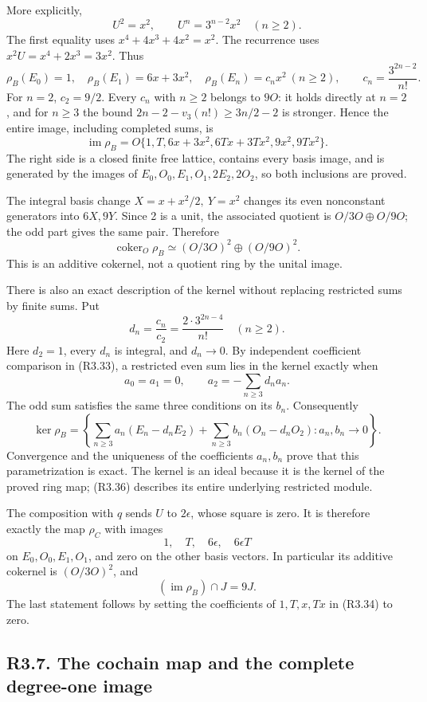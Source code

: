 \documentclass[
  10pt,
]{article}
\begin{document}
More explicitly, \[
U^2=x^2,\qquad U^n=3^{n-2}x^2\quad(n\ge2).
\tag{R3.32}
\] The first equality uses \(x^4+4x^3+4x^2=x^2\). The recurrence uses
\(x^2U=x^4+2x^3=3x^2\). Thus \[
\rho_B(E_0)=1,\quad \rho_B(E_1)=6x+3x^2,\quad
\rho_B(E_n)=c_nx^2\ (n\ge2),\qquad
c_n=\frac{3^{2n-2}}{n!}.
\tag{R3.33}
\] For \(n=2\), \(c_2=9/2\). Every \(c_n\) with \(n\ge2\) belongs to
\(9O\): it holds directly at \(n=2\), and for \(n\ge3\) the bound
\(2n-2-v_3(n!)\ge 3n/2-2\) is stronger. Hence the entire image,
including completed sums, is \[
\operatorname{im}\rho_B
=O\{1,T,6x+3x^2,6Tx+3Tx^2,9x^2,9Tx^2\}.
\tag{R3.34}
\] The right side is a closed finite free lattice, contains every basis
image, and is generated by the images of \(E_0,O_0,E_1,O_1,2E_2,2O_2\),
so both inclusions are proved.

The integral basis change \(X=x+x^2/2,\ Y=x^2\) changes its even
nonconstant generators into \(6X,9Y\). Since 2 is a unit, the associated
quotient is \(O/3O\oplus O/9O\); the odd part gives the same pair.
Therefore \[
\operatorname{coker}_O\rho_B
\simeq(O/3O)^2\oplus(O/9O)^2.
\tag{R3.35}
\] This is an additive cokernel, not a quotient ring by the unital
image.

There is also an exact description of the kernel without replacing
restricted sums by finite sums. Put \[
d_n=\frac{c_n}{c_2}=\frac{2\cdot3^{2n-4}}{n!}\quad(n\ge2).
\] Here \(d_2=1\), every \(d_n\) is integral, and \(d_n\to0\). By
independent coefficient comparison in (R3.33), a restricted even sum
lies in the kernel exactly when \[
a_0=a_1=0,\qquad
a_2=-\sum_{n\ge3}d_na_n.
\] The odd sum satisfies the same three conditions on its \(b_n\).
Consequently \[
\ker\rho_B=
\left\{
\sum_{n\ge3}a_n(E_n-d_nE_2)
+\sum_{n\ge3}b_n(O_n-d_nO_2):
a_n,b_n\to0
\right\}.
\tag{R3.36}
\] Convergence and the uniqueness of the coefficients \(a_n,b_n\) prove
that this parametrization is exact. The kernel is an ideal because it is
the kernel of the proved ring map; (R3.36) describes its entire
underlying restricted module.

The composition with \(q\) sends \(U\) to \(2\epsilon\), whose square is
zero. It is therefore exactly the map \(\rho_C\) with images \[
1,\quad T,\quad6\epsilon,\quad6\epsilon T
\] on \(E_0,O_0,E_1,O_1\), and zero on the other basis vectors. In
particular its additive cokernel is \((O/3O)^2\), and \[
(\operatorname{im}\rho_B)\cap J=9J.
\tag{R3.37}
\] The last statement follows by setting the coefficients of
\(1,T,x,Tx\) in (R3.34) to zero.

\subsection{R3.7. The cochain map and the complete degree-one
image}\label{r3.7.-the-cochain-map-and-the-complete-degree-one-image}
\end{document}
